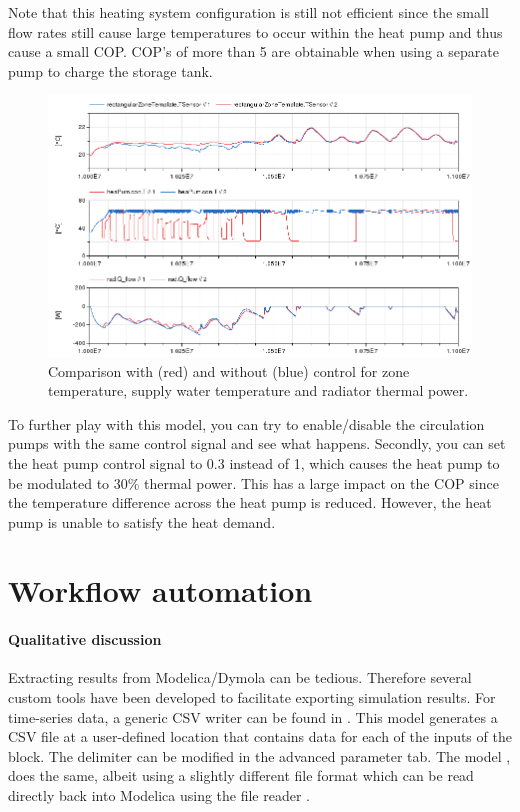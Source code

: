 \documentclass[10pt,a4paper]{article}
\begin{document}
Note that this heating system configuration is still 
not efficient since the small flow rates still cause 
large temperatures to occur within the heat pump
and thus cause a small COP.
COP's of more than 5 are obtainable when using a separate
pump to charge the storage tank.


\begin{figure}
\centering
\includegraphics[width=\linewidth]{Example7.png}
\caption{Comparison with (red) and without (blue) control for zone temperature, supply water temperature and radiator thermal power.}
\label{fig:res2}
\end{figure}


To further play with this model, you can try to enable/disable the circulation pumps with the same control
signal and see what happens.
Secondly, you can set the heat pump control signal to 0.3 instead of 1,
which causes the heat pump to be modulated to 30\% thermal power.
This has a large impact on the COP since the temperature difference across the heat 
pump is reduced. 
However, the heat pump is unable to satisfy the heat demand.



\section{Workflow automation}
\paragraph{Qualitative discussion}
Extracting results from Modelica/Dymola can be tedious. 
Therefore several custom tools have been developed to facilitate exporting simulation results.
For time-series data, a generic CSV writer can be found in .
This model generates a CSV file at a user-defined location that contains
data for each of the inputs of the block. 
The delimiter can be modified in the advanced parameter tab.
The model , does the same, albeit using a slightly
different file format which can be read directly back into Modelica using the
file reader .\\
\end{document}

